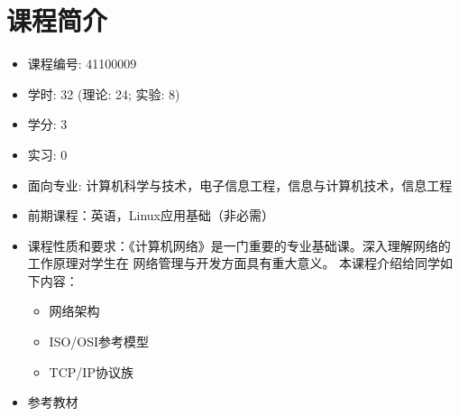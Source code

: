 \documentclass{wx672article}
\begin{document}
\section{课程简介}
\label{sec-4}

\begin{itemize}
\item 课程编号: 41100009
\item 学时: 32 (理论: 24; 实验: 8)
\item 学分: 3
\item 实习: 0
\item 面向专业: 计算机科学与技术，电子信息工程，信息与计算机技术，信息工程
\item 前期课程：英语，Linux应用基础（非必需）
\item 课程性质和要求：《计算机网络》是一门重要的专业基础课。深入理解网络的工作原理对学生在
  网络管理与开发方面具有重大意义。 本课程介绍给同学如下内容：
  \begin{itemize}
  \item 网络架构
  \item ISO/OSI参考模型
  \item TCP/IP协议族
  \end{itemize}
\item 参考教材\hfill
  \nocite{tanenbaum2011computer,fall2011tcp,kurose2013computer,bautts2005linux,hunt2002tcp,hall2009beej}
  \printbibliography[heading=none]{}
\end{itemize}
\end{document}
